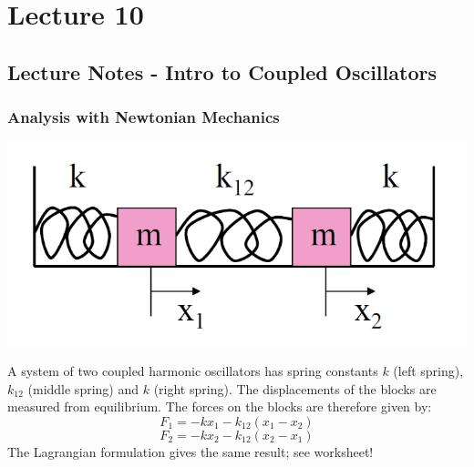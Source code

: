 \documentclass[../PHYS306Notes.tex]{subfiles}
\begin{document}
\section{Lecture 10}
\subsection{Lecture Notes - Intro to Coupled Oscillators}
\subsubsection{Analysis with Newtonian Mechanics}
\begin{center}
    \includegraphics[scale=0.5]{Lecture-10/w10-img1.png}
\end{center}
A system of two coupled harmonic oscillators has spring constants $k$ (left spring), $k_{12}$ (middle spring) and $k$ (right spring). The displacements of the blocks are measured from equilibrium. The forces on the blocks are therefore given by:
\[F_1 = -kx_1 - k_{12}(x_1 - x_2)\]
\[F_2 = -kx_2 - k_{12}(x_2 - x_1)\]
The Lagrangian formulation gives the same result; see worksheet!
\end{document}
